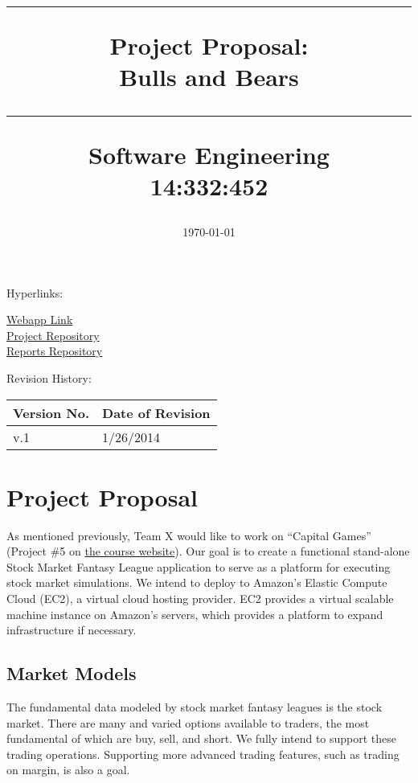 \documentclass[11pt,letterpaper,oneside]{memoir}
\title{%
{\color{color2} \hrule}\vspace{1cm}
\Huge{\color{color1} Project Proposal:\\Bulls and Bears %
\vspace{1cm}
{\color{color2} \hrule}\vspace{1cm}}
\Large{ \color{color2} Software Engineering\\
14:332:452}
}
\author{\huge{\color{color0}Team 1:\\}\vskip.1in
\Large{\href{mailto:david.patrzeba@gmail.com}{David Patrzeba}\\
\href{mailto:eric.jacob.10@gmail.com}{Eric Jacob}\\
\href{mailto:evanarbeitman@gmail.edu}{Evan Arbeitman}\\
\href{mailto:christopher.a.mancuso@gmail.com}{Christopher Mancuso}\\
\href{mailto:dkarivalis@gmail.edu}{David Karivalis}\\
\href{mailto:jdlziegler@gmail.com}{Jesse Ziegler}}}
\date{\today}
\begin{document}
\titleGM    %

Hyperlinks:\\
\begin{center}
\href{http://192.241.248.91}{Webapp Link}\\
\href{https://github.com/dkarivalis/SEP_SMIFL}{Project Repository}\\
\href{https://github.com/dkarivalis/SEP_SMIFL_reports}{Reports Repository}\\
\end{center}

Revision History:
\begin{longtable}{|p{1.6in}|p{2.6in}|}
\hline
{\large \color{color1}Version No.}&{\large \color{color1}Date of Revision} \\ \hline
v.1&1/26/2014  \\ \hline 
\end{longtable}

\pagebreak  %
\tableofcontents %


\chapter{Project Proposal}
\label{proposal}
As mentioned previously, Team X would like to work on ``Capital Games''
(Project \#5 on 
\href{http://ece.rutgers.edu/~marsic/books/SE/projects/}{the course website}).
Our goal is to create a functional stand-alone Stock Market Fantasy League application
to serve as a platform for executing stock market simulations. We intend to deploy
to Amazon's Elastic Compute Cloud (EC2), a virtual cloud hosting provider. EC2 provides
a virtual scalable machine instance on Amazon's servers, which provides a platform to 
expand infrastructure if necessary.

\section{Market Models}

The fundamental data modeled by stock market fantasy leagues is the stock market. There
are many and varied options available to traders, the most fundamental of which are
buy, sell, and short. We fully intend to support these trading operations. Supporting 
more advanced trading features, such as trading on margin, is also a goal. 
\end{document}
